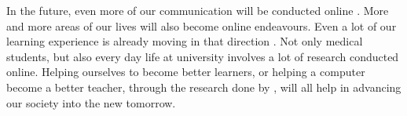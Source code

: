 \documentclass[11pt,a4paper]{article}
\begin{document}
\vspace{0.5pc}

In the future, even more of our communication will be conducted online \cite{pew}. More and more areas of our lives will also become online endeavours. Even a lot of our learning experience is already moving in that direction \cite{lancaster}. Not only medical students, but also every day life at university involves a lot of research conducted online. Helping ourselves to become better learners, or helping a computer become a better teacher, through the research done by \cite{wing}, will all help in advancing our society into the new tomorrow.





\nocite{*}
\end{document}

